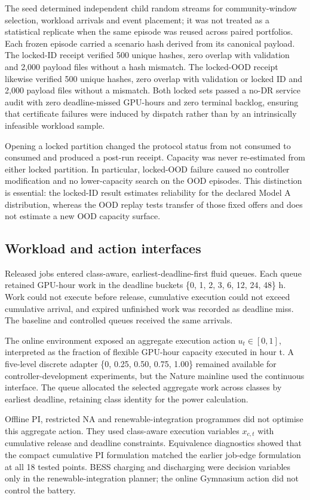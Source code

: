 \documentclass[10pt,a4paper]{article}
\begin{document}
The seed determined independent child random streams for community-window selection, workload arrivals and event placement; it was not treated as a statistical replicate when the same episode was reused across paired portfolios. Each frozen episode carried a scenario hash derived from its canonical payload. The locked-ID receipt verified 500 unique hashes, zero overlap with validation and 2,000 payload files without a hash mismatch. The locked-OOD receipt likewise verified 500 unique hashes, zero overlap with validation or locked ID and 2,000 payload files without a mismatch. Both locked sets passed a no-DR service audit with zero deadline-missed GPU-hours and zero terminal backlog, ensuring that certificate failures were induced by dispatch rather than by an intrinsically infeasible workload sample.


Opening a locked partition changed the protocol status from not consumed to consumed and produced a post-run receipt. Capacity was never re-estimated from either locked partition. In particular, locked-OOD failure caused no controller modification and no lower-capacity search on the OOD episodes. This distinction is essential: the locked-ID result estimates reliability for the declared Model A distribution, whereas the OOD replay tests transfer of those fixed offers and does not estimate a new OOD capacity surface.


\subsection{Workload and action interfaces}

Released jobs entered class-aware, earliest-deadline-first fluid queues. Each queue retained GPU-hour work in the deadline buckets \{0, 1, 2, 3, 6, 12, 24, 48\} h. Work could not execute before release, cumulative execution could not exceed cumulative arrival, and expired unfinished work was recorded as deadline miss. The baseline and controlled queues received the same arrivals.


The online environment exposed an aggregate execution action \(u_t\in[0,1]\), interpreted as the fraction of flexible GPU-hour capacity executed in hour t. A five-level discrete adapter \{0, 0.25, 0.50, 0.75, 1.00\} remained available for controller-development experiments, but the Nature mainline used the continuous interface. The queue allocated the selected aggregate work across classes by earliest deadline, retaining class identity for the power calculation.


Offline PI, restricted NA and renewable-integration programmes did not optimise this aggregate action. They used class-aware execution variables \(x_{c,t}\) with cumulative release and deadline constraints. Equivalence diagnostics showed that the compact cumulative PI formulation matched the earlier job-edge formulation at all 18 tested points. BESS charging and discharging were decision variables only in the renewable-integration planner; the online Gymnasium action did not control the battery.
\end{document}
